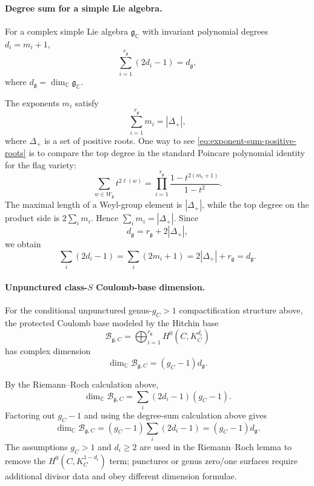 \paragraph{Degree sum for a simple Lie algebra.}
For a complex simple Lie algebra \(\mathfrak g_{\mathbb C}\) with invariant
polynomial degrees \(d_i=m_i+1\),
\begin{equation}
  \sum_{i=1}^{r_{\mathfrak g}}(2d_i-1)=d_{\mathfrak g},
  \label{eq:lie-degree-sum-dimension}
\end{equation}
where \(d_{\mathfrak g}=\dim_{\mathbb C}\mathfrak g_{\mathbb C}\).

The exponents \(m_i\) satisfy
\begin{equation}
  \sum_{i=1}^{r_{\mathfrak g}}m_i=|\Delta_+|,
  \label{eq:exponent-sum-positive-roots}
\end{equation}
where \(\Delta_+\) is a set of positive roots.  One way to see
\eqref{eq:exponent-sum-positive-roots} is to compare the top degree in the
standard Poincare polynomial identity for the flag variety:
\[
  \sum_{w\in W_{\mathfrak g}}t^{2\ell(w)}
  =
  \prod_{i=1}^{r_{\mathfrak g}}
  \frac{1-t^{2(m_i+1)}}{1-t^2}.
\]
The maximal length of a Weyl-group element is \(|\Delta_+|\), while the top
degree on the product side is \(2\sum_i m_i\).  Hence
\(\sum_i m_i=|\Delta_+|\).  Since
\[
  d_{\mathfrak g}=r_{\mathfrak g}+2|\Delta_+|,
\]
we obtain
\[
  \sum_i(2d_i-1)
  =
  \sum_i(2m_i+1)
  =
  2|\Delta_+|+r_{\mathfrak g}
  =
  d_{\mathfrak g}.
\]

\paragraph{Unpunctured class-\(S\) Coulomb-base dimension.}
For the conditional unpunctured genus-\(g_C>1\) compactification structure above,
the protected
Coulomb base modeled by the Hitchin base
\begin{equation}
  \mathcal B_{\mathfrak g,C}
  =
  \bigoplus_{i=1}^{r_{\mathfrak g}} H^0(C,K_C^{d_i})
  \label{eq:class-s-hitchin-base}
\end{equation}
has complex dimension
\begin{equation}
  \dim_{\mathbb C}\mathcal B_{\mathfrak g,C}
  =
  (g_C-1)d_{\mathfrak g}.
  \label{eq:class-s-coulomb-dimension}
\end{equation}

By the Riemann--Roch calculation above,
\begin{equation}
  \dim_{\mathbb C}\mathcal B_{\mathfrak g,C}
  =
  \sum_i(2d_i-1)(g_C-1).
  \label{eq:hitchin-base-dimension-sum}
\end{equation}
Factoring out \(g_C-1\) and using the degree-sum calculation above gives
\[
  \dim_{\mathbb C}\mathcal B_{\mathfrak g,C}
  =
  (g_C-1)\sum_i(2d_i-1)
  =
  (g_C-1)d_{\mathfrak g}.
\]
The assumptions \(g_C>1\) and \(d_i\ge2\) are used in the Riemann--Roch
lemma to remove the \(H^0(C,K_C^{1-d_i})\) term; punctures or genus zero/one
surfaces require additional divisor data and obey different dimension
formulae.

